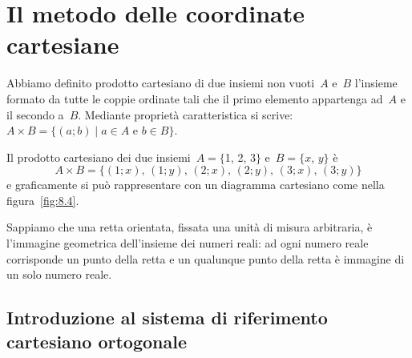 
\vspazio\ovalbox{\risolvii \ref{ese:\thechapter.17}, \ref{ese:\thechapter.18}, \ref{ese:\thechapter.19}}

\section{Il metodo delle coordinate cartesiane}\label{sect:coordinate_cartesiane}

Abbiamo definito prodotto cartesiano di due insiemi non vuoti~$A$ e~$B$ l'insieme formato da tutte
le coppie ordinate tali che il primo elemento appartenga ad~$A$ e il secondo a~$B$. Mediante proprietà caratteristica
si scrive:~$A\times B=\{(a;b)\mid a\in A\text{ e }b\in B\}$.
\pagebreak
\begin{exrig}
 \begin{esempio}
 \label{ex:8.11}
Il prodotto cartesiano dei due insiemi~$A=\{$1, 2, 3$\}$ e~$B=\{x$, $y\}$ è
\[A \times B = \{(1;x)\text{, }(1;y)\text{, }(2;x)\text{, }(2;y)\text{, }(3;x)\text{, }(3;y)\}\]
e graficamente si può rappresentare con un diagramma cartesiano come nella figura~\ref{fig:8.4}.

Sappiamo che una retta orientata, fissata una unità di misura arbitraria, è l'immagine geometrica dell'insieme dei numeri reali:
ad ogni numero reale corrisponde un punto della retta e un qualunque punto della retta è immagine di un solo numero reale.
 \end{esempio}
\end{exrig}

\subsection{Introduzione al sistema di riferimento cartesiano ortogonale}

